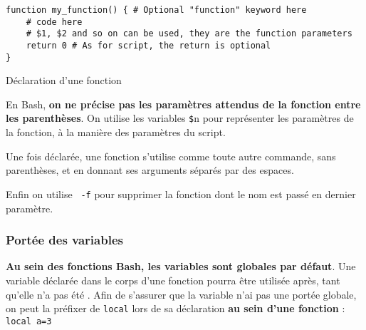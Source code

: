\begin{code}
\begin{verbatim}
function my_function() { # Optional "function" keyword here
    # code here
    # $1, $2 and so on can be used, they are the function parameters
    return 0 # As for script, the return is optional
}
\end{verbatim}
\vspace{-5mm}
\caption{Déclaration d'une fonction}
    \label{code:function}
\end{code}

 En Bash, \textbf{on ne précise pas les paramètres attendus de la fonction entre les parenthèses}. On utilise les variables \texttt{\$}n pour représenter les paramètres de la fonction, à la manière des paramètres du script.

Une fois déclarée, une fonction s'utilise comme toute autre commande, sans parenthèses, et en donnant ses arguments séparés par des espaces.

Enfin on utilise \texttt{ -f} pour supprimer la fonction dont le nom est passé en dernier paramètre.


\subsubsection{Portée des variables}
\textbf{Au sein des fonctions Bash, les variables sont globales par défaut}. Une variable déclarée dans le corps d'une fonction pourra être utilisée après, tant qu'elle n'a pas été .
Afin de s'assurer que la variable n'ai pas une portée globale, on peut la préfixer de \texttt{local} lors de sa déclaration \textbf{au sein d'une fonction} : \texttt{local a=3}
